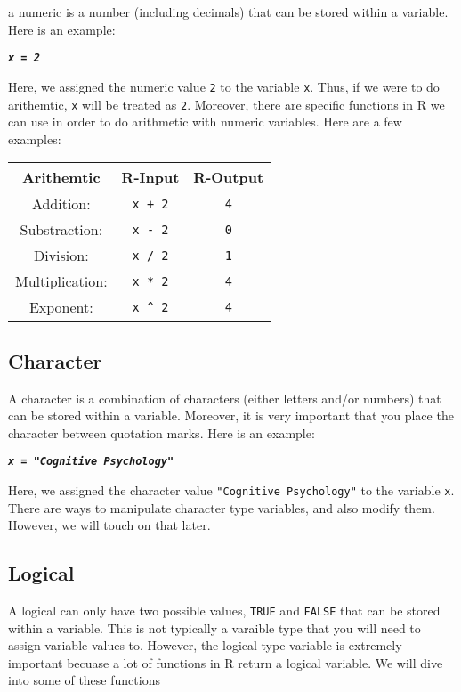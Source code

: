 \documentclass[
]{book}
\begin{document}
a numeric is a number (including decimals) that can be stored within a variable. Here is an example:

\textbf{\emph{\texttt{x\ =\ 2}}}

Here, we assigned the numeric value \texttt{2} to the variable \texttt{x}. Thus, if we were to do arithemtic, \texttt{x} will be treated as \texttt{2}. Moreover, there are specific functions in R we can use in order to do arithmetic with numeric variables. Here are a few examples:

\begin{longtable}[]{@{}ccc@{}}
\toprule
Arithemtic & R-Input & R-Output\tabularnewline
\midrule
\endhead
Addition: & \texttt{x\ +\ 2} & \texttt{4}\tabularnewline
Substraction: & \texttt{x\ -\ 2} & \texttt{0}\tabularnewline
Division: & \texttt{x\ /\ 2} & \texttt{1}\tabularnewline
Multiplication: & \texttt{x\ *\ 2} & \texttt{4}\tabularnewline
Exponent: & \texttt{x\ \^{}\ 2} & \texttt{4}\tabularnewline
\bottomrule
\end{longtable}

\hypertarget{character}{%
\subsection{Character}\label{character}}

A character is a combination of characters (either letters and/or numbers) that can be stored within a variable. Moreover, it is very important that you place the character between quotation marks. Here is an example:

\textbf{\emph{\texttt{x\ =\ "Cognitive\ Psychology"}}}

Here, we assigned the character value \texttt{"Cognitive\ Psychology"} to the variable \texttt{x}. There are ways to manipulate character type variables, and also modify them. However, we will touch on that later.

\hypertarget{logical}{%
\subsection{Logical}\label{logical}}

A logical can only have two possible values, \texttt{TRUE} and \texttt{FALSE} that can be stored within a variable. This is not typically a varaible type that you will need to assign variable values to. However, the logical type variable is extremely important becuase a lot of functions in R return a logical variable. We will dive into some of these functions
\end{document}
